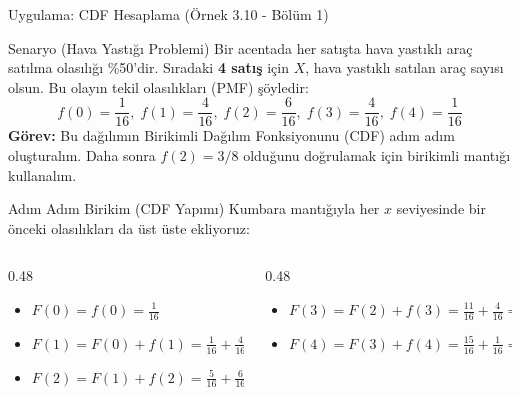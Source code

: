 ﻿\documentclass[light]{lutbeamer}
\begin{document}
\begin{frame}{Uygulama: CDF Hesaplama (Örnek 3.10 - Bölüm 1)}
    \footnotesize
    \begin{block}{Senaryo (Hava Yastığı Problemi)}
      Bir acentada her satışta hava yastıklı araç satılma olasılığı \%50'dir. Sıradaki \textbf{4 satış} için $X$, hava yastıklı satılan araç sayısı olsun.
      Bu olayın tekil olasılıkları (PMF) şöyledir:
      \[
      f(0)=\frac{1}{16}, \; f(1)=\frac{4}{16}, \; f(2)=\frac{6}{16}, \; f(3)=\frac{4}{16}, \; f(4)=\frac{1}{16}
      \]
      \textbf{Görev:} Bu dağılımın Birikimli Dağılım Fonksiyonunu (CDF) adım adım oluşturalım. Daha sonra $f(2) = 3/8$ olduğunu doğrulamak için birikimli mantığı kullanalım.
    \end{block}
    
    \begin{exampleblock}{Adım Adım Birikim (CDF Yapımı)}
      Kumbara mantığıyla her $x$ seviyesinde bir önceki olasılıkları da üst üste ekliyoruz:
      \vspace{0.1cm}
      \begin{columns}[T]
          \begin{column}{0.48\textwidth}
              \begin{itemize}
                  \item $F(0) = f(0) = \frac{1}{16}$
                  \item $F(1) = F(0) + f(1) = \frac{1}{16} + \frac{4}{16} = \frac{5}{16}$
                  \item $F(2) = F(1) + f(2) = \frac{5}{16} + \frac{6}{16} = \frac{11}{16}$
              \end{itemize}
          \end{column}
          \begin{column}{0.48\textwidth}
              \begin{itemize}
                  \item $F(3) = F(2) + f(3) = \frac{11}{16} + \frac{4}{16} = \frac{15}{16}$
                  \item $F(4) = F(3) + f(4) = \frac{15}{16} + \frac{1}{16} = \mathbf{1} \;\checkmark$
              \end{itemize}
          \end{column}
      \end{columns}
      \vspace{0.1cm}
    \end{exampleblock}
\end{frame}
\end{document}
